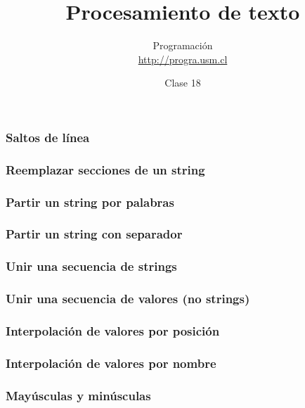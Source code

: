 \documentclass[12pt]{beamer}
\title{Procesamiento de texto}
\author{
  Programación \\ \url{http://progra.usm.cl}
}
\date{Clase 18}
\begin{document}
  \begin{frame}
    \maketitle
  \end{frame}

  \begin{frame}
    \label{saltos-linea}
    \frametitle{Saltos de línea}
    
  \end{frame}

  \begin{frame}
    \label{reemplazar}
    \frametitle{Reemplazar secciones de un string}
    
  \end{frame}

  \begin{frame}
    \label{partir-string-palabras}
    \frametitle{Partir un string por palabras}
    
  \end{frame}

  \begin{frame}
    \label{partir-string-separador}
    \frametitle{Partir un string con separador}
    
  \end{frame}

  \begin{frame}
    \label{unir-strings}
    \frametitle{Unir una secuencia de strings}
    
  \end{frame}

  \begin{frame}
    \label{unir-valores}
    \frametitle{Unir una secuencia de valores (no strings)}
    
  \end{frame}

  \begin{frame}
    \label{interpolacion-posicion}
    \frametitle{Interpolación de valores por posición}
    
  \end{frame}

  \begin{frame}
    \label{interpolacion-nombre}
    \frametitle{Interpolación de valores por nombre}
    
  \end{frame}

  \begin{frame}
    \label{mayusculas-minusculas}
    \frametitle{Mayúsculas y minúsculas}
    
  \end{frame}
\end{document}
